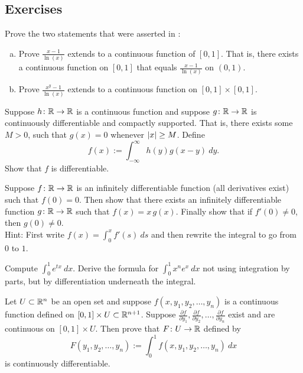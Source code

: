 \subsection{Exercises}

\begin{exercise} \label{exercise:counterexamplediffunder}
Prove the two statements that were asserted in
:
\begin{enumerate}[a)]
\item
Prove $\frac{x-1}{\ln(x)}$ extends to a continuous function of
$[0,1]$.  That is, there exists a continuous function on $[0,1]$
that equals $\frac{x-1}{\ln(x)}$ on $(0,1)$.
\item
Prove $\frac{x^y-1}{\ln(x)}$ extends to a continuous function
on $[0,1] \times [0,1]$.
\end{enumerate}
\end{exercise}

\begin{exercise}
Suppose $h \colon {\mathbb{R}} \to {\mathbb{R}}$ is a continuous function and suppose $g
\colon {\mathbb{R}} \to {\mathbb{R}}$ is continuously differentiable and compactly
supported.  That is, there exists some $M > 0$, such that $g(x) = 0$ whenever
$\left\lvert {x} \right\rvert \geq M$.  Define
\begin{equation*}
f(x) := \int_{-\infty}^\infty h(y)g(x-y)~dy  .
\end{equation*}
Show that $f$ is differentiable.
\end{exercise}

\begin{exercise}
Suppose $f \colon {\mathbb{R}} \to {\mathbb{R}}$ is an infinitely differentiable function (all derivatives exist)
such that $f(0) = 0$.  Then show that there exists an infinitely
differentiable function $g \colon {\mathbb{R}} \to {\mathbb{R}}$ such that $f(x) = x\,g(x)$.  Finally show that
if $f'(0) \not= 0$, then $g(0) \not= 0$.\\
Hint: First write
$f(x) = \int_0^x f'(s) ~ds$ and then rewrite the integral to go
from $0$ to $1$.
\end{exercise}


\begin{exercise}
Compute $\int_0^1 e^{tx} ~dx$.  Derive the formula for
$\int_0^1 x^n e^{x} ~dx$ not using integration by parts, but
by differentiation underneath the integral.
\end{exercise}

\begin{exercise}
Let $U \subset {\mathbb{R}}^n$ be an open set and suppose
$f(x,y_1,y_2,\ldots,y_n)$ is a continuous
function defined on $[0,1] \times U \subset {\mathbb{R}}^{n+1}$.
Suppose
$\frac{\partial f}{\partial y_1},
\frac{\partial f}{\partial y_2},\ldots,
\frac{\partial f}{\partial y_n}$
exist and are continuous on $[0,1] \times U$.
Then prove that $F \colon U \to {\mathbb{R}}$ defined by
\begin{equation*}
F(y_1,y_2,\ldots,y_n) :=
\int_0^1
f(x,y_1,y_2,\ldots,y_n)
~ dx
\end{equation*}
is continuously differentiable.
\end{exercise}

